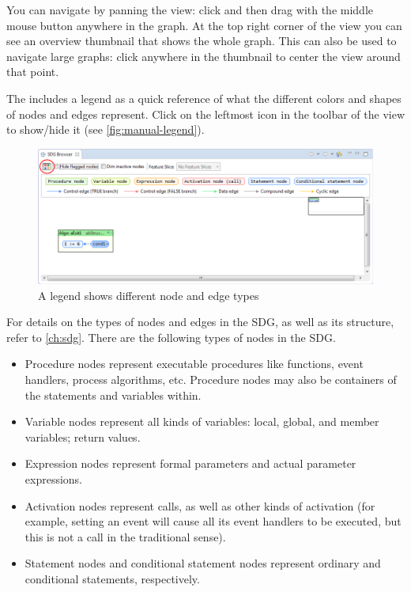 You can navigate by panning the view: click and then drag with the middle mouse button anywhere in the graph. At the 
top right corner of the \SB view you can see an overview thumbnail that shows the whole graph. This can also be used to 
navigate large graphs: click anywhere in the thumbnail to center the view around that point.

The \SB includes a legend as a quick reference of what the different colors and shapes of nodes and edges represent. 
Click on the leftmost icon in the toolbar of the \SB view to show/hide it (see \autoref{fig:manual-legend}).

\begin{figure}[hp]
  \centering
    \includegraphics[width=\textwidth]{bilder/manual-legend}
  \caption{A legend shows different node and edge types}
  \label{fig:manual-legend}
\end{figure}

For details on the types of nodes and edges in the SDG, as well as its structure, refer to \autoref{ch:sdg}. There are 
the following types of nodes in the SDG.

\begin{itemize}
  \item Procedure nodes represent executable procedures like functions, event handlers, process algorithms, etc. 
  Procedure nodes may also be containers of the statements and variables within.
  
  \item Variable nodes represent all kinds of variables: local, global, and member variables; return values.
  
  \item Expression nodes represent formal parameters and actual parameter expressions.
  
  \item Activation nodes represent calls, as well as other kinds of activation (for example, setting an event will 
  cause all its event handlers to be executed, but this is not a call in the traditional sense).
  
  \item Statement nodes and conditional statement nodes represent ordinary and conditional statements, respectively.
\end{itemize}

